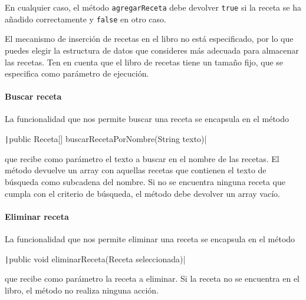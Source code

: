 \documentclass[
    a4paper, %
    12pt, %
]{CSSullivanBusinessReport}
\begin{document}

En cualquier caso, el método \texttt{agregarReceta} debe devolver \texttt{true} si la receta se ha añadido correctamente y \texttt{false} en otro caso.

El mecanismo de inserción de recetas en el libro no está especificado, por lo que puedes elegir la estructura de datos que consideres más adecuada para almacenar las recetas. Ten en cuenta que el libro de recetas tiene un tamaño fijo, que se especifica como parámetro de ejecución.

\paragraph{Buscar receta}

La funcionalidad que nos permite buscar una receta se encapsula en el método

\texttt|public Receta[] buscarRecetaPorNombre(String texto)|

que recibe como parámetro el texto a buscar en el nombre de las recetas. El método devuelve un array con aquellas recetas que contienen el texto de búsqueda como subcadena del nombre. Si no se encuentra ninguna receta que cumpla con el criterio de búsqueda, el método debe devolver un array vacío.

\paragraph{Eliminar receta}

La funcionalidad que nos permite eliminar una receta se encapsula en el método

\texttt|public void eliminarReceta(Receta seleccionada)|

que recibe como parámetro la receta a eliminar. Si la receta no se encuentra en el libro, el método no realiza ninguna acción.
\end{document}
